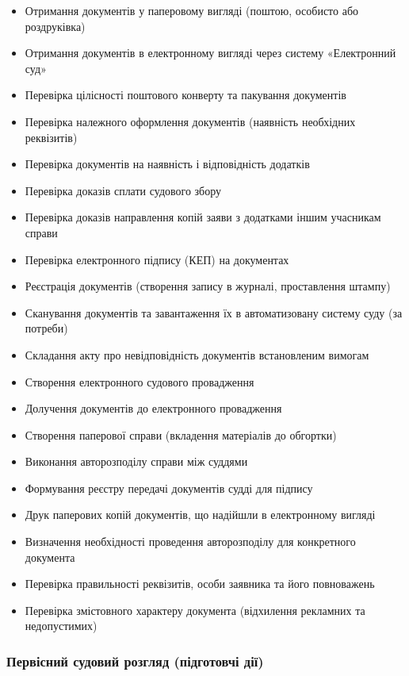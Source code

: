 \documentclass{article}
\begin{document}
\begin{itemize}
    \item Отримання документів у паперовому вигляді (поштою, особисто або роздруківка)
    \item Отримання документів в електронному вигляді через систему «Електронний суд»
    \item Перевірка цілісності поштового конверту та пакування документів
    \item Перевірка належного оформлення документів (наявність необхідних реквізитів)
    \item Перевірка документів на наявність і відповідність додатків
    \item Перевірка доказів сплати судового збору
    \item Перевірка доказів направлення копій заяви з додатками іншим учасникам справи
    \item Перевірка електронного підпису (КЕП) на документах
    \item Реєстрація документів (створення запису в журналі, проставлення штампу)
    \item Сканування документів та завантаження їх в автоматизовану систему суду (за потреби)
    \item Складання акту про невідповідність документів встановленим вимогам
    \item Створення електронного судового провадження
    \item Долучення документів до електронного провадження
    \item Створення паперової справи (вкладення матеріалів до обгортки)
    \item Виконання авторозподілу справи між суддями
    \item Формування реєстру передачі документів судді для підпису
    \item Друк паперових копій документів, що надійшли в електронному вигляді
    \item Визначення необхідності проведення авторозподілу для конкретного документа
    \item Перевірка правильності реквізитів, особи заявника та його повноважень
    \item Перевірка змістовного характеру документа (відхилення рекламних та недопустимих)
\end{itemize}

\newpage
\subsubsection{Первісний судовий розгляд (підготовчі дії)}
\end{document}
